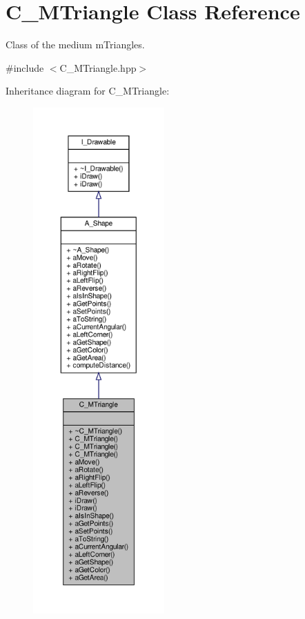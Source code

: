 \hypertarget{classC__MTriangle}{}\section{C\+\_\+\+M\+Triangle Class Reference}
\label{classC__MTriangle}


Class of the medium m\+Triangles.  




{\ttfamily \#include $<$C\+\_\+\+M\+Triangle.\+hpp$>$}



Inheritance diagram for C\+\_\+\+M\+Triangle\+:
\nopagebreak
\begin{figure}[H]
\begin{center}
\leavevmode
\includegraphics[height=550pt]{classC__MTriangle__inherit__graph}
\end{center}
\end{figure}


